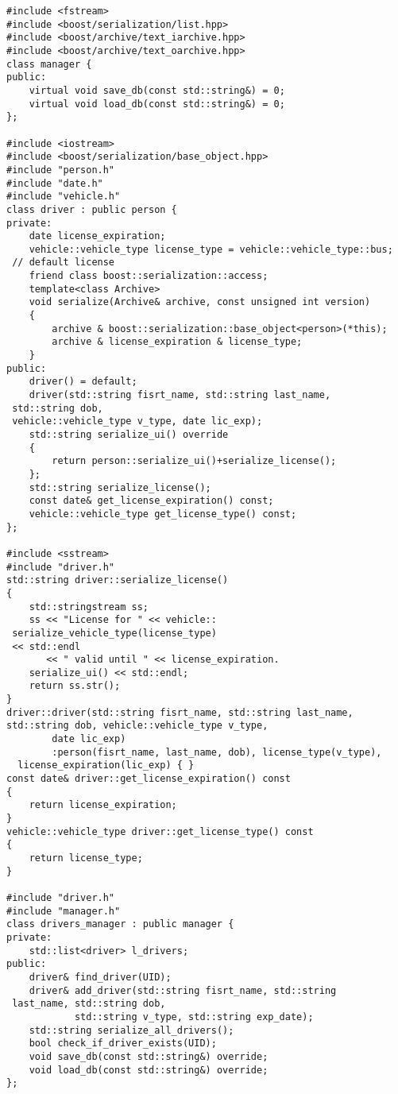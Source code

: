\begin{verbatim}
#include <fstream>
#include <boost/serialization/list.hpp>
#include <boost/archive/text_iarchive.hpp>
#include <boost/archive/text_oarchive.hpp>
class manager {
public:
	virtual void save_db(const std::string&) = 0;
	virtual void load_db(const std::string&) = 0;
};

#include <iostream>
#include <boost/serialization/base_object.hpp>
#include "person.h"
#include "date.h"
#include "vehicle.h"
class driver : public person {
private:
	date license_expiration;
	vehicle::vehicle_type license_type = vehicle::vehicle_type::bus;
 // default license
	friend class boost::serialization::access;
	template<class Archive>
	void serialize(Archive& archive, const unsigned int version)
	{
		archive & boost::serialization::base_object<person>(*this);
		archive & license_expiration & license_type;
	}
public:
	driver() = default;
	driver(std::string fisrt_name, std::string last_name, 
 std::string dob,
 vehicle::vehicle_type v_type, date lic_exp);
	std::string serialize_ui() override
	{
		return person::serialize_ui()+serialize_license();
	};
	std::string serialize_license();
	const date& get_license_expiration() const;
	vehicle::vehicle_type get_license_type() const;
};

#include <sstream>
#include "driver.h"
std::string driver::serialize_license()
{
	std::stringstream ss;
	ss << "License for " << vehicle::
 serialize_vehicle_type(license_type)
 << std::endl
	   << " valid until " << license_expiration.
    serialize_ui() << std::endl;
	return ss.str();
}
driver::driver(std::string fisrt_name, std::string last_name, 
std::string dob, vehicle::vehicle_type v_type,
		date lic_exp)
		:person(fisrt_name, last_name, dob), license_type(v_type),
  license_expiration(lic_exp) { }
const date& driver::get_license_expiration() const
{
	return license_expiration;
}
vehicle::vehicle_type driver::get_license_type() const
{
	return license_type;
}

#include "driver.h"
#include "manager.h"
class drivers_manager : public manager {
private:
	std::list<driver> l_drivers;
public:
	driver& find_driver(UID);
	driver& add_driver(std::string fisrt_name, std::string 
 last_name, std::string dob,
			std::string v_type, std::string exp_date);
	std::string serialize_all_drivers();
	bool check_if_driver_exists(UID);
	void save_db(const std::string&) override;
	void load_db(const std::string&) override;
};


\end{verbatim}
